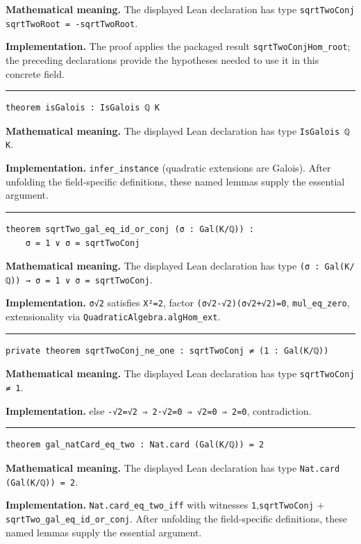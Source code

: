 \documentclass[UTF8,a4paper,11pt,fontset=fandol]{ctexart}
\theoremstyle{definition}
\newcommand{\statementsep}{\par\medskip\hrule\medskip}
\begin{document}
\noindent\textbf{Mathematical meaning.} The displayed Lean declaration has type \texttt{sqrtTwoConj sqrtTwoRoot = -sqrtTwoRoot}.\par
\noindent\textbf{Implementation.} The proof applies the packaged result \texttt{sqrtTwoConjHom\_\allowbreak{}root}; the preceding declarations provide the hypotheses needed to use it in this concrete field.\par
\statementsep
\begin{verbatim}
theorem isGalois : IsGalois ℚ K
\end{verbatim}
\noindent\textbf{Mathematical meaning.} The displayed Lean declaration has type \texttt{IsGalois ℚ K}.\par
\noindent\textbf{Implementation.} \texttt{infer\_\allowbreak{}instance} (quadratic extensions are Galois). After unfolding the field-specific definitions, these named lemmas supply the essential argument.\par
\statementsep
\begin{verbatim}
theorem sqrtTwo_gal_eq_id_or_conj (σ : Gal(K/ℚ)) :
    σ = 1 ∨ σ = sqrtTwoConj
\end{verbatim}
\noindent\textbf{Mathematical meaning.} The displayed Lean declaration has type \texttt{(σ : Gal(K/\allowbreak{}ℚ)) → σ = 1 ∨ σ = sqrtTwoConj}.\par
\noindent\textbf{Implementation.} \texttt{σ√2} satisfies \texttt{X²=2}, factor \texttt{(σ√2-√2)(σ√2+√2)=0}, \texttt{mul\_\allowbreak{}eq\_\allowbreak{}zero}, extensionality via \texttt{QuadraticAlgebra.\allowbreak{}algHom\_\allowbreak{}ext}.\par
\statementsep
\begin{verbatim}
private theorem sqrtTwoConj_ne_one : sqrtTwoConj ≠ (1 : Gal(K/ℚ))
\end{verbatim}
\noindent\textbf{Mathematical meaning.} The displayed Lean declaration has type \texttt{sqrtTwoConj ≠ 1}.\par
\noindent\textbf{Implementation.} else \texttt{-√2=√2 ⇒ 2·√2=0 ⇒ √2=0 ⇒ 2=0}, contradiction.\par
\statementsep
\begin{verbatim}
theorem gal_natCard_eq_two : Nat.card (Gal(K/ℚ)) = 2
\end{verbatim}
\noindent\textbf{Mathematical meaning.} The displayed Lean declaration has type \texttt{Nat.\allowbreak{}card (Gal(K/\allowbreak{}ℚ)) = 2}.\par
\noindent\textbf{Implementation.} \texttt{Nat.\allowbreak{}card\_\allowbreak{}eq\_\allowbreak{}two\_\allowbreak{}iff} with witnesses \texttt{1},\texttt{sqrtTwoConj} + \texttt{sqrtTwo\_\allowbreak{}gal\_\allowbreak{}eq\_\allowbreak{}id\_\allowbreak{}or\_\allowbreak{}conj}. After unfolding the field-specific definitions, these named lemmas supply the essential argument.\par
\end{document}
